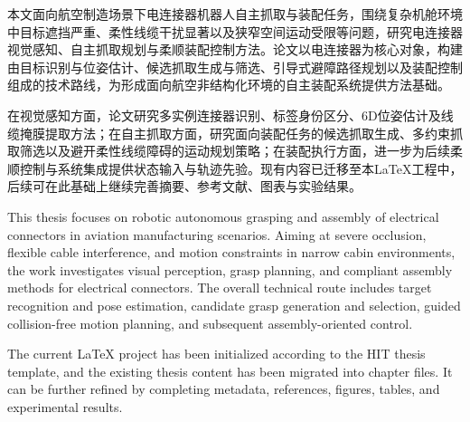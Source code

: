 ﻿

\begin{cabstract}
本文面向航空制造场景下电连接器机器人自主抓取与装配任务，围绕复杂机舱环境中目标遮挡严重、柔性线缆干扰显著以及狭窄空间运动受限等问题，研究电连接器视觉感知、自主抓取规划与柔顺装配控制方法。论文以电连接器为核心对象，构建由目标识别与位姿估计、候选抓取生成与筛选、引导式避障路径规划以及装配控制组成的技术路线，为形成面向航空非结构化环境的自主装配系统提供方法基础。

在视觉感知方面，论文研究多实例连接器识别、标签身份区分、6D位姿估计及线缆掩膜提取方法；在自主抓取方面，研究面向装配任务的候选抓取生成、多约束抓取筛选以及避开柔性线缆障碍的运动规划策略；在装配执行方面，进一步为后续柔顺控制与系统集成提供状态输入与轨迹先验。现有内容已迁移至本LaTeX工程中，后续可在此基础上继续完善摘要、参考文献、图表与实验结果。
\end{cabstract}

\begin{eabstract}
This thesis focuses on robotic autonomous grasping and assembly of electrical connectors in aviation manufacturing scenarios. Aiming at severe occlusion, flexible cable interference, and motion constraints in narrow cabin environments, the work investigates visual perception, grasp planning, and compliant assembly methods for electrical connectors. The overall technical route includes target recognition and pose estimation, candidate grasp generation and selection, guided collision-free motion planning, and subsequent assembly-oriented control.

The current LaTeX project has been initialized according to the HIT thesis template, and the existing thesis content has been migrated into chapter files. It can be further refined by completing metadata, references, figures, tables, and experimental results.
\end{eabstract}
